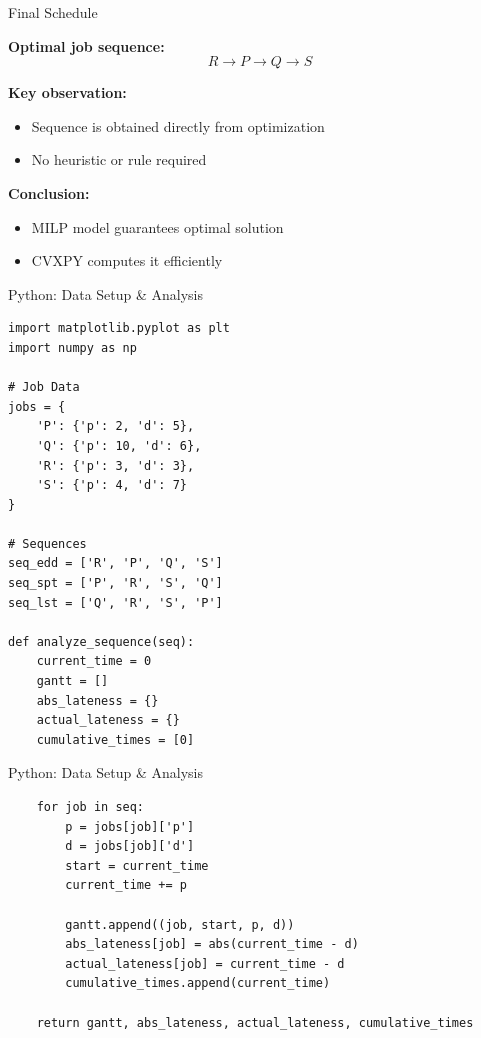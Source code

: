 \documentclass[12pt, aspectratio=169]{beamer}
\begin{document}
\begin{frame}{Final Schedule}

\textbf{Optimal job sequence:}
\[
R \rightarrow P \rightarrow Q \rightarrow S
\]

\vspace{0.5em}

\textbf{Key observation:}
\begin{itemize}
\item Sequence is obtained directly from optimization
\item No heuristic or rule required
\end{itemize}

\vspace{0.5em}

\textbf{Conclusion:}
\begin{itemize}
\item MILP model guarantees optimal solution
\item CVXPY computes it efficiently
\end{itemize}

\end{frame}

\begin{frame}[fragile]{Python: Data Setup \& Analysis}
\begin{lstlisting}
import matplotlib.pyplot as plt
import numpy as np

# Job Data
jobs = {
    'P': {'p': 2, 'd': 5},
    'Q': {'p': 10, 'd': 6},
    'R': {'p': 3, 'd': 3},
    'S': {'p': 4, 'd': 7}
}

# Sequences
seq_edd = ['R', 'P', 'Q', 'S']
seq_spt = ['P', 'R', 'S', 'Q']
seq_lst = ['Q', 'R', 'S', 'P']

def analyze_sequence(seq):
    current_time = 0
    gantt = []
    abs_lateness = {}
    actual_lateness = {}
    cumulative_times = [0]
\end{lstlisting}
\end{frame}
\begin{frame}[fragile]{Python: Data Setup \& Analysis}
\begin{lstlisting}
    for job in seq:
        p = jobs[job]['p']
        d = jobs[job]['d']
        start = current_time
        current_time += p

        gantt.append((job, start, p, d))
        abs_lateness[job] = abs(current_time - d)
        actual_lateness[job] = current_time - d
        cumulative_times.append(current_time)

    return gantt, abs_lateness, actual_lateness, cumulative_times
\end{lstlisting}
\end{frame}
\end{document}
